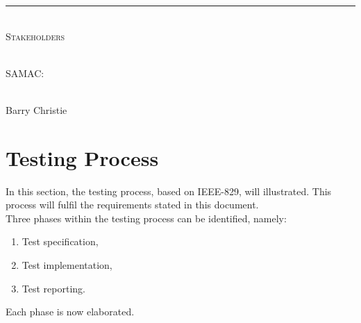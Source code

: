 \documentclass[12pt]{article}
\begin{document}
\begin{titlepage}
\begin{center}
		\vspace{1cm}
		\rule{\linewidth}{0.5mm} \\[1cm]
		\textsc{\Large Stakeholders}\\[1cm]

		\begin{minipage}{0.4\textwidth}
			\begin{flushleft} \large
				\emph{} \\
				SAMAC:
			\end{flushleft}
		\end{minipage}
		\begin{minipage}{0.4\textwidth}
			\begin{flushright} \large
				\emph{} \\
				Barry Christie
			\end{flushright}
		\end{minipage}


	\end{center}
\end{titlepage}

\newpage
{}
\tableofcontents
\newpage
\listoffigures

\newpage
{}
  

\section{Testing Process}
In this section, the testing process, based on IEEE-829, will illustrated. This process will fulfil the requirements stated in this document.\\
\indent Three phases within the testing process can be identified, namely:
\begin{enumerate}
	\item Test specification,
	\item Test implementation,
	\item Test reporting.
\end{enumerate}
Each phase is now elaborated.
\end{document}
